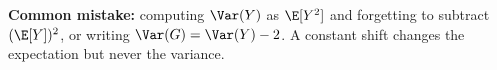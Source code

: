 \begin{solution}
\begin{remark}
		\textbf{Common mistake:} computing $\Var(Y)$ as $\E[Y^2]$ and forgetting
		to subtract $(\E[Y])^2$, or writing $\Var(G)=\Var(Y)-2$. A constant
		shift changes the expectation but never the variance.
	\end{remark}
\end{solution}
